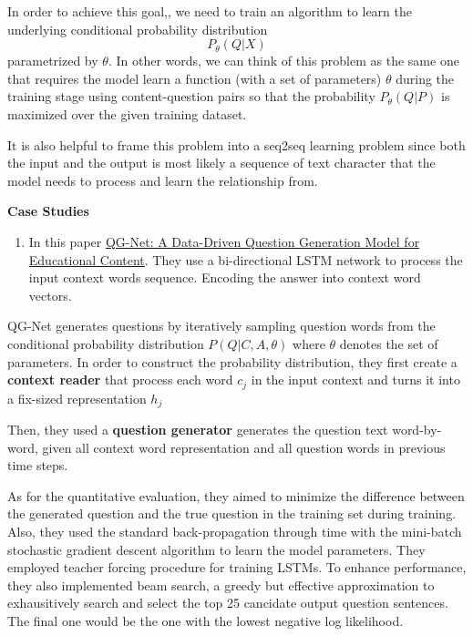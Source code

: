 \documentclass{acm_proc_article-sp}
\renewcommand{\paragraph}[1]{\vskip 6pt\noindent\textbf{#1 }}
\providecommand{\tightlist}{%
  \setlength{\itemsep}{0pt}\setlength{\parskip}{0pt}}
\begin{document}
In order to achieve this goal,, we need to train an algorithm to learn
the underlying conditional probability distribution \[P_{\theta}(Q|X)\]
parametrized by \(\theta\). In other words, we can think of this problem
as the same one that requires the model learn a function (with a set of
parameters) \(\theta\) during the training stage using content-question
pairs so that the probability \(P_{\theta}(Q|P)\) is maximized over the
given training dataset.

It is also helpful to frame this problem into a seq2seq learning problem
since both the input and the output is most likely a sequence of text
character that the model needs to process and learn the relationship
from.

\paragraph{Case Studies}\label{case-studies}

\begin{enumerate}
\def\labelenumi{\arabic{enumi}.}
\tightlist
\item
  In this paper
  \href{http://www.princeton.edu/~shitingl/papers/18l@s-qgen.pdf}{QG-Net:
  A Data-Driven Question Generation Model for Educational Content}. They
  use a bi-directional LSTM network to process the input context words
  sequence. Encoding the answer into context word vectors.
\end{enumerate}

QG-Net generates questions by iteratively sampling question words from
the conditional probability distribution \(P(Q|C,A,\theta)\) where
\(\theta\) denotes the set of parameters. In order to construct the
probability distribution, they first create a \textbf{context reader}
that process each word \(c_j\) in the input context and turns it into a
fix-sized representation \(h_j\)

Then, they used a \textbf{question generator} generates the question
text word-by-word, given all context word representation and all
question words in previous time steps.

As for the quantitative evaluation, they aimed to minimize the
difference between the generated question and the true question in the
training set during training. Also, they used the standard
back-propagation through time with the mini-batch stochastic gradient
descent algorithm to learn the model parameters. They employed teacher
forcing procedure for training LSTMs. To enhance performance, they also
implemented beam search, a greedy but effective approximation to
exhausitively search and select the top 25 cancidate output question
sentences. The final one would be the one with the lowest negative log
likelihood.
\end{document}
